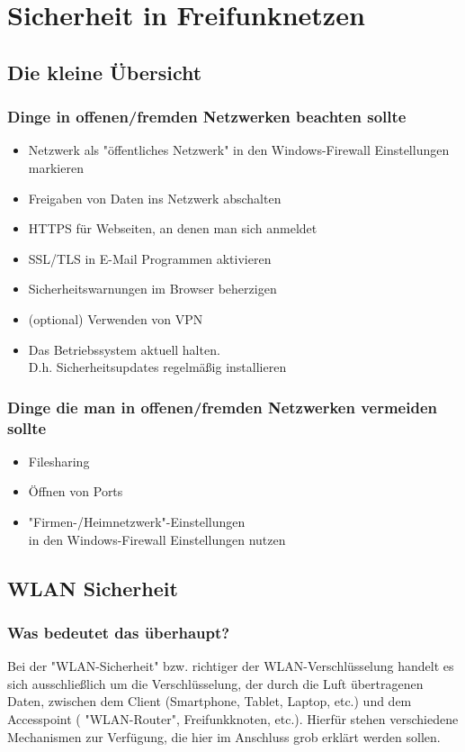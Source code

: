 \section{Sicherheit in Freifunknetzen}
\subsection{Die kleine Übersicht}

\subsubsection{Dinge in offenen/fremden Netzwerken beachten sollte}
\begin{itemize}
\item Netzwerk als "öffentliches Netzwerk" in den Windows-Firewall Einstellungen\\ markieren
\item Freigaben von Daten ins Netzwerk abschalten
\item HTTPS für Webseiten, an denen man sich anmeldet
\item SSL/TLS in E-Mail Programmen aktivieren
\item Sicherheitswarnungen im Browser beherzigen
\item (optional) Verwenden von VPN
\item Das Betriebssystem aktuell halten. \\D.h. Sicherheitsupdates regelmäßig installieren
\end{itemize}

\subsubsection{Dinge die man in offenen/fremden Netzwerken vermeiden sollte}

\begin{itemize}
\item Filesharing
\item Öffnen von Ports
\item "Firmen-/Heimnetzwerk"-Einstellungen \\in den Windows-Firewall Einstellungen nutzen
\end{itemize}

\subsection{WLAN Sicherheit}
\subsubsection{Was bedeutet das überhaupt?}
Bei der  "WLAN-Sicherheit"  bzw. richtiger der WLAN-Verschlüsselung handelt es 
sich ausschließlich um die Verschlüsselung, der durch die Luft übertragenen 
Daten, zwischen dem Client (Smartphone, Tablet, Laptop, etc.) und dem 
Accesspoint ( "WLAN-Router", Freifunkknoten, etc.). Hierfür stehen verschiedene 
Mechanismen zur Verfügung, die hier im Anschluss grob erklärt werden sollen.


